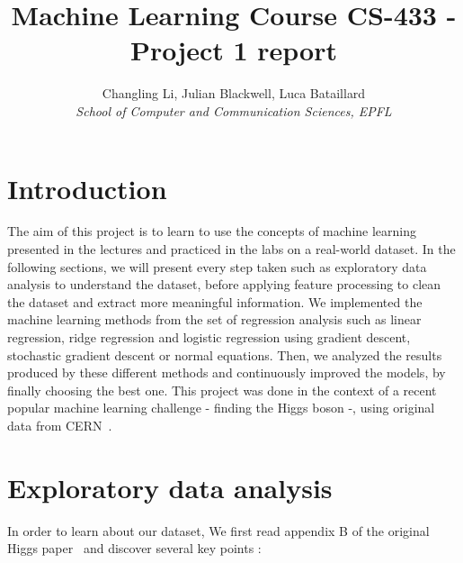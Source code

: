 \documentclass[10pt,conference,compsocconf]{IEEEtran}
\begin{document}
\title{Machine Learning Course CS-433 - Project 1 report}

\author{
  Changling Li, Julian Blackwell, Luca Bataillard\\
  \textit{School of Computer and Communication Sciences, EPFL}
}

\maketitle

\section{Introduction}
The aim of this project is to learn to use the concepts of machine learning presented in the lectures and practiced in the labs on a
real-world dataset. In the following sections, we will present every step taken such as exploratory data analysis to understand the dataset, before applying feature processing to clean the dataset and extract more meaningful information. We implemented the machine learning methods from the set of regression analysis such as linear regression, ridge regression and logistic regression using gradient descent, stochastic gradient descent or normal equations. Then, we analyzed the results produced by these different methods and continuously improved the models, by finally choosing the best one. This project was done in the context of a recent popular machine learning challenge - finding the Higgs boson -, using original data from CERN~\cite{higgs}.

\section{Exploratory data analysis}
\label{sec:structure-paper}

In order to learn about our dataset, We first read appendix B of the original Higgs paper~\cite{higgs} and discover several key points : 
\end{document}
